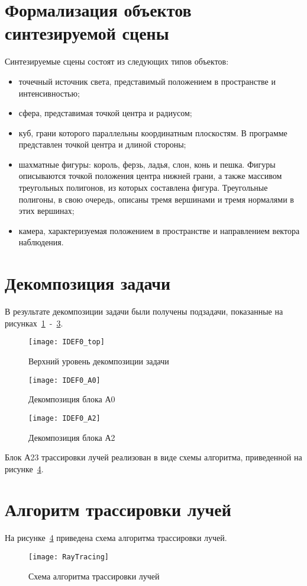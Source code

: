 \section{Формализация объектов синтезируемой сцены}
Синтезируемые сцены состоят из следующих типов объектов:
\begin{itemize}
	\item точечный источник света, представимый положением в пространстве и интенсивностью;
	\item сфера, представимая точкой центра и радиусом;
	\item куб, грани которого параллельны координатным плоскостям. В программе представлен точкой центра и длиной стороны;
	\item шахматные фигуры: король, ферзь, ладья, слон, конь и пешка. Фигуры описываются точкой положения центра нижней грани, а также массивом треугольных полигонов, из которых составлена фигура. Треугольные полигоны, в свою очередь, описаны тремя вершинами и тремя нормалями в этих вершинах;
	\item камера, характеризуемая положением в пространстве и направлением вектора наблюдения.
\end{itemize}


\section{Декомпозиция задачи}
В результате декомпозиции задачи были получены подзадачи, показанные на рисунках~\ref{fig:IDEF0_top}~-~\ref{fig:IDEF0_2}.

\begin{figure}[H]
	\centering
	\texttt{[image: IDEF0\_top]}
	\caption{Верхний уровень декомпозиции задачи}
	\label{fig:IDEF0_top}
\end{figure}

\begin{figure}[H]
	\centering
	\texttt{[image: IDEF0\_A0]}
	\caption{Декомпозиция блока А0}
	\label{fig:IDEF0_1}
\end{figure}

\begin{figure}[H]
	\centering
	\texttt{[image: IDEF0\_A2]}
	\caption{Декомпозиция блока А2}
	\label{fig:IDEF0_2}
\end{figure}

Блок А23 трассировки лучей реализован в виде схемы алгоритма, приведенной на рисунке~\ref{fig:RayTracing}.


\section{Алгоритм трассировки лучей}
На рисунке~\ref{fig:RayTracing} приведена схема алгоритма трассировки лучей.
\begin{figure}[H]
	\centering
	\texttt{[image: RayTracing]}
	\caption{Схема алгоритма трассировки лучей}
	\label{fig:RayTracing}
\end{figure}

